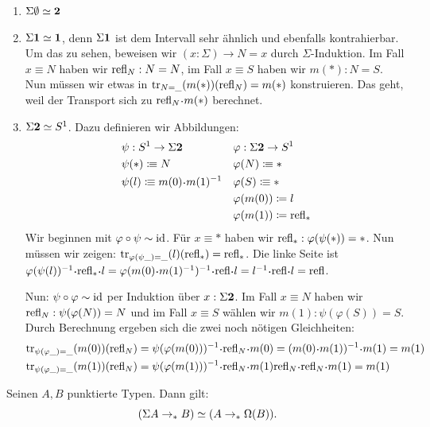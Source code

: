 \begin{beispiel}
  \begin{enumerate}
  \item $\Sigma \emptyset\simeq \mathbf{2}$
  \item $\Sigma\mathbf{1}\simeq \mathbf{1}$, denn $\Sigma \mathbf{1}$ ist dem Intervall sehr ähnlich und ebenfalls kontrahierbar.
    Um das zu sehen, beweisen wir $(x:\Sigma)\to N=x$ durch $\Sigma$-Induktion.
    Im Fall $x\equiv N$ haben wir $\mathrm{refl}_N:N=N$, im Fall $x\equiv S$ haben wir $m(\ast):N=S$.
    Nun müssen wir etwas in $\mathrm{tr}_{N=\_}(m(\ast))(\mathrm{refl}_N)=m(\ast)$ konstruieren.
    Das geht, weil der Transport sich zu $\refl_N\kon m(\ast)$ berechnet.
  \item $\Sigma\mathbf{2}\simeq S^1$. Dazu definieren wir Abbildungen:
    \begin{align*}
      &\psi:S^1\to\Sigma\zwei &&\varphi: \Sigma\zwei\to S^1 \\
      &\psi(\ast)\colonequiv N &&\varphi(N)\colonequiv \ast \\
      &\psi(l)\colonequiv m(0)\kon m(1)^{-1} &&\varphi(S)\colonequiv \ast \\
      & &&\varphi(m(0))\coloneq l \\
      & &&\varphi(m(1))\coloneq \refl_\ast
    \end{align*}
    Wir beginnen mit $\varphi\circ\psi\sim\mathrm{id}$. Für $x\equiv\ast$ haben wir $\mathrm{refl}_\ast:\varphi(\psi(\ast))=\ast$. Nun müssen wir zeigen: $\mathrm{tr}_{\varphi(\psi\_)=\_}(l)(\mathrm{refl}_\ast)=\mathrm{refl}_\ast$. Die linke Seite ist $\varphi(\psi(l))^{-1}\kon\refl_\ast\kon l=\varphi(m(0)\kon m(1)^{-1})^{-1}\kon\refl\kon l=l^{-1}\kon\refl\kon l=\refl$.

    Nun: $\psi\circ\varphi\sim\mathrm{id}$ per Induktion über $x:\Sigma\mathbf{2}$.
    Im Fall $x\equiv N$ haben wir $\mathrm{refl}_N:\psi(\varphi(N))=N$
    und im Fall $x\equiv S$ wählen wir $m(1):\psi(\varphi(S))=S$.
    Durch Berechnung ergeben sich die zwei noch nötigen Gleichheiten:
    \begin{align*}
      &\transp_{\psi(\varphi\_)=\_}(m(0))(\refl_N)=\psi(\varphi(m(0)))^{-1}\kon\refl_N\kon m(0)=(m(0)\kon m(1))^{-1}\kon m(1) =m(1) \\
      &\transp_{\psi(\varphi\_)=\_}(m(1))(\refl_N)=\psi(\varphi(m(1)))^{-1}\kon\refl_N\kon m(1)\refl_N\kon\refl_N\kon m(1)=m(1)
    \end{align*}
  \end{enumerate}
\end{beispiel}

\begin{lemma}
  \label{suspension-schleifenraum-equiv}
  Seinen $A,B$ punktierte Typen. Dann gilt:
  \[
    (\Sigma A\to_\ast B)\simeq (A\to_\ast \Omega(B))\rlap{.}
  \]
\end{lemma}


